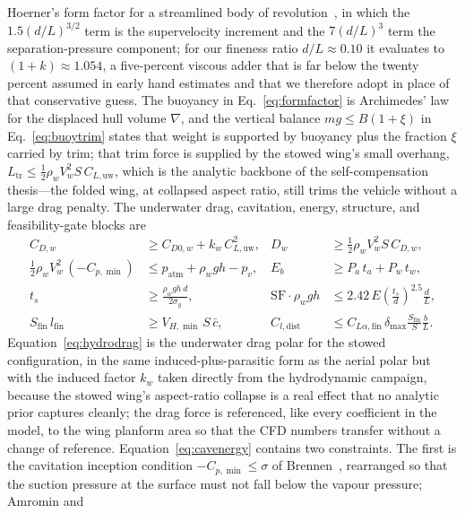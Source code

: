 \documentclass[conf]{new-aiaa}
\begin{document}
Hoerner's form factor for a streamlined body of revolution~\cite{hoerner1965fluid}, in which the
$1.5(d/L)^{3/2}$ term is the supervelocity increment and the $7(d/L)^3$ term the
separation-pressure component; for our fineness ratio $d/L\approx0.10$ it evaluates to
$(1+k)\approx1.054$, a five-percent viscous adder that is far below the twenty percent assumed in
early hand estimates and that we therefore adopt in place of that conservative guess. The buoyancy in
Eq.~\eqref{eq:formfactor} is Archimedes' law for the displaced hull volume $\nabla$, and the vertical
balance $mg\le B(1+\xi)$ in Eq.~\eqref{eq:buoytrim} states that weight is supported by buoyancy plus
the fraction $\xi$ carried by trim; that trim force is supplied by the stowed wing's small overhang,
$L_{\text{tr}}\le\tfrac12\rho_w V_w^2 S\,C_{L,\text{uw}}$, which is the analytic backbone of the
self-compensation thesis---the folded wing, at collapsed aspect ratio, still trims the vehicle
without a large drag penalty. The underwater drag, cavitation, energy, structure, and
feasibility-gate blocks are
\begin{align}
C_{D,w} &\ge C_{D0,w} + k_w\,C_{L,\text{uw}}^2, & D_w &\ge \tfrac12\rho_w V_w^2 S\,C_{D,w},\label{eq:hydrodrag}\\
\tfrac12\rho_w V_w^2\,(-C_{p,\min}) &\le p_{\text{atm}} + \rho_w g h - p_v,
      & E_b &\ge P_a\,t_a + P_w\,t_w, \label{eq:cavenergy}\\
t_s &\ge \frac{\rho_w g h\,d}{2\sigma_y}, & \mathrm{SF}\cdot\rho_w g h &\le 2.42\,E\!\left(\tfrac{t_s}{d}\right)^{2.5}\!\!\frac{d}{L}, \label{eq:structure}\\
S_{\text{fin}}\,l_{\text{fin}} &\ge V_{H,\min}\,S\,\bar c, & C_{l,\text{dist}} &\le C_{L\alpha,\text{fin}}\,\delta_{\max}\frac{S_{\text{fin}}}{S}\frac{b}{L}. \label{eq:gates}
\end{align}
Equation~\eqref{eq:hydrodrag} is the underwater drag polar for the stowed configuration, in the same
induced-plus-parasitic form as the aerial polar but with the induced factor $k_w$ taken directly from
the hydrodynamic campaign, because the stowed wing's aspect-ratio collapse is a real effect that no
analytic prior captures cleanly; the drag force is referenced, like every coefficient in the model,
to the wing planform area so that the CFD numbers transfer without a change of reference.
Equation~\eqref{eq:cavenergy} contains two constraints. The first is the cavitation inception
condition $-C_{p,\min}\le\sigma$ of Brennen~\cite{brennen2014cavitation}, rearranged so that the
suction pressure at the surface must not fall below the vapour pressure; Amromin and
\end{document}
